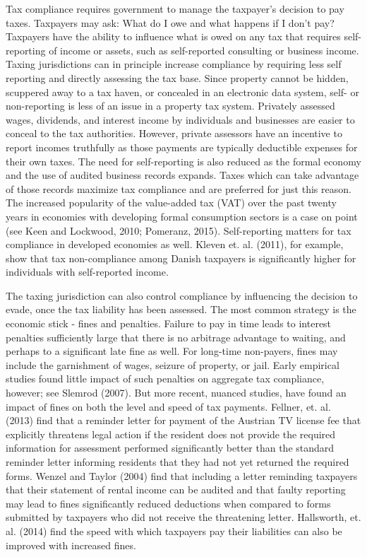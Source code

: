 \documentclass[12pt,titlepage]{article}
\begin{document}
Tax compliance requires government to manage the taxpayer's decision
to pay taxes.  Taxpayers may ask: What do I owe and what happens if I
don't pay?  Taxpayers have the ability to influence what is owed on
any tax that requires self-reporting of income or assets, such as
self-reported consulting or business income.  Taxing jurisdictions can
in principle increase compliance by requiring less self reporting and
directly assessing the tax base.  Since property cannot be hidden,
scuppered away to a tax haven, or concealed in an electronic data
system, self- or non-reporting is less of an issue in a property tax
system.  Privately assessed wages, dividends, and interest income by
individuals and businesses are easier to conceal to the tax
authorities.  However, private assessors have an incentive to report
incomes truthfully as those payments are typically deductible expenses
for their own taxes.  The need for self-reporting is also reduced as
the formal economy and the use of audited business records expands.
Taxes which can take advantage of those records maximize tax
compliance and are preferred for just this reason.  The increased
popularity of the value-added tax (VAT) over the past twenty years in
economies with developing formal consumption sectors is a case on
point (see Keen and Lockwood, 2010; Pomeranz, 2015).  Self-reporting
matters for tax compliance in developed economies as well.  Kleven
et. al. (2011), for example, show that tax non-compliance among Danish
taxpayers is significantly higher for individuals with self-reported
income.

The taxing jurisdiction can also control compliance by influencing the
decision to evade, once the tax liability has been assessed.  The most
common strategy is the economic stick - fines and penalties.  Failure
to pay in time leads to interest penalties sufficiently large that
there is no arbitrage advantage to waiting, and perhaps to a
significant late fine as well.  For long-time non-payers, fines may
include the garnishment of wages, seizure of property, or jail.  Early
empirical studies found little impact of such penalties on aggregate
tax compliance, however; see Slemrod (2007).  But more recent, nuanced
studies, have found an impact of fines on both the level and speed of
tax payments.  Fellner, et. al. (2013) find that a reminder letter for 
payment of the Austrian TV license fee that explicitly threatens legal action 
if the resident does not provide the required information for assessment 
performed significantly better than the standard reminder letter informing 
residents that they had not yet returned the required forms.   
Wenzel and Taylor (2004) find that including a letter reminding taxpayers
 that their statement of rental income can be audited and that faulty 
 reporting may lead to fines significantly reduced deductions when 
 compared to forms submitted by taxpayers who did not receive the threatening letter.
Hallsworth, et. al. (2014) find the speed with which taxpayers pay their liabilities can
also be improved with increased fines.
\end{document}
